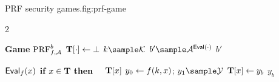     \begin{gamefigure}{PRF security games.}{fig:prf-game}
        \begin{games}{2}
            \begin{gameenv}{\textbf{Game} $\text{PRF}^b_{f, \mathcal{A}}$}
                \State $\mathbf{T}[\cdot] \leftarrow \bot$
                \State $k \sample \mathcal{K}$
                \State $b' \sample \adversary{A}^{\Eval(\cdot)}$
                \State \Return $b'$
            \end{gameenv}
            \gamebreak
            \begin{gameenv}{\oracle $\textsf{Eval}_{f}(x)$}
                \State $\textbf{if } x \in \mathbf{T} \textbf{ then}$
                    \State $\quad $\Return $\mathbf{T}[x]$
                    \State $y_0 \leftarrow f(k, x)$; $y_1 \sample \mathcal{Y}$
                    \State $\mathbf{T}[x] \leftarrow y_b$
                    \State \Return $y_b$
                \end{gameenv}
            \end{games}
        \end{gamefigure}
